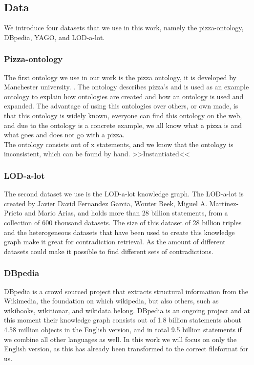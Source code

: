 \documentclass{article}
\begin{document}
\subsection{Data}
We introduce four datasets that we use in this work, namely the pizza-ontology, DBpedia, YAGO, and LOD-a-lot.

\subsubsection{Pizza-ontology}
The first ontology we use in our work is the pizza ontology, it is developed by Manchester university. \cite{pizza}. The ontology describes pizza's and is used as an example ontology to explain how ontologies are created and how an ontology is used and expanded. The advantage of using this ontologies over others, or own made, is that this ontology is widely known, everyone can find this ontology on the web, and due to the ontology is a concrete example, we all know what a pizza is and what goes and does not go with a pizza. \\

The ontology consists out of x statements, and we know that the ontology is inconsistent, which can be found by hand.
>>Instantiated<<

\subsubsection{LOD-a-lot}
The second dataset we use is the LOD-a-lot\cite{JavierD:2017} knowledge graph. The LOD-a-lot is created by Javier David Fernandez Garcia, Wouter Beek, Miguel A. Martínez-Prieto and Mario Arias, and holds more than 28 billion statements, from a collection of 600 thousand datasets. The size of this dataset of 28 billion triples and the heterogeneous datasets that have been used to create this knowledge graph make it great for contradiction retrieval. As the amount of different datasets could make it possible to find different sets of contradictions.

\subsubsection{DBpedia}
DBpedia\cite{DBpedia} is a crowd sourced project that extracts structural information from the Wikimedia, the foundation on which wikipedia, but also others, such as wikibooks, wikitionar, and wikidata belong. DBpedia is an ongoing project and at this moment their knowledge graph consists out of 1.8 billion statements about 4.58 million objects in the English version, and in total 9.5 billion statements if we combine all other languages as well. In this work we will focus on only the English version, as this has already been transformed to the correct fileformat for us. 
\end{document}
